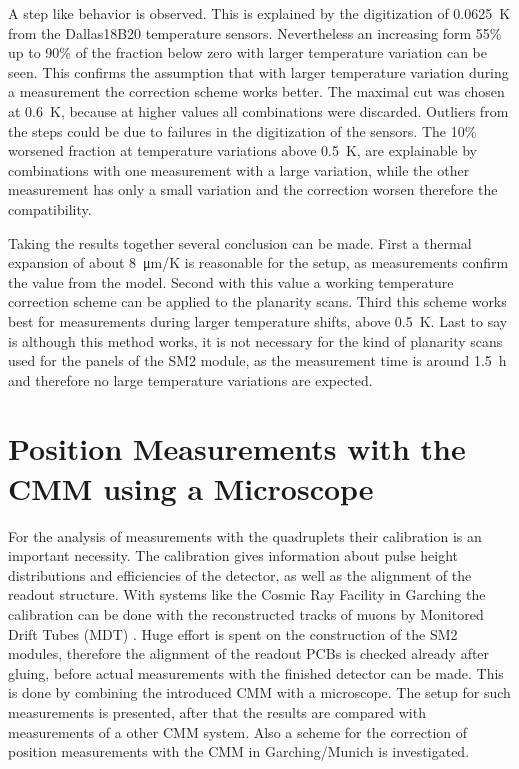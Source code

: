 \documentclass[
a4paper,                                %
twoside,                                %
BCOR1.4cm,                      %
10pt,                           %
headings=normal,                %
headsepline,                    %
clearplainpage, %
final,                                  %
div=14,
parskip=full,
openright,
bibliography=toc
]{scrreprt}
\begin{document}
A step like behavior is observed. This is explained by the digitization of \SI{0.0625}{\K} from the Dallas18B20 temperature sensors. Nevertheless an increasing form 55\% up to 90\% of the fraction below zero with larger temperature variation can be seen. This confirms the assumption that with larger temperature variation during a measurement the correction scheme works better. The maximal cut was chosen at \SI{0.6}{\K}, because at higher values all combinations were discarded. Outliers from the steps could be due to failures in the digitization of the sensors. The 10\% worsened fraction at temperature variations above \SI{0.5}{\K}, are explainable by combinations with one measurement with a large variation, while the other measurement has only a small variation and the correction worsen therefore the compatibility.

Taking the results together several conclusion can be made. First a thermal expansion of about \SI{8}{\micro\m/\K} is reasonable for the setup, as measurements confirm the value from the model. Second with this value a working temperature correction scheme can be applied to the planarity scans. Third this scheme works best for measurements during larger temperature shifts, above \SI{0.5}{\K}. Last to say is although this method works, it is not necessary for the kind of planarity scans used for the panels of the SM2 module, as the measurement time is around \SI{1.5}{\hour} and therefore no  large temperature variations are expected.

\chapter{Position Measurements with the CMM using a Microscope}

For the analysis of measurements with the quadruplets their calibration is an important necessity. The calibration gives information about pulse height distributions and efficiencies of the detector, as well as the alignment of the readout structure. With systems like the Cosmic Ray Facility in Garching the calibration can be done with the reconstructed tracks of muons by Monitored Drift Tubes (MDT) \cite{felixRthesis}. Huge effort is spent on the construction of the SM2 modules, therefore the alignment of the readout PCBs is checked already after gluing, before actual measurements with the finished detector can be made. This is done by combining the introduced CMM with a microscope. The setup for such measurements is presented, after that the results are compared with measurements of a other CMM system. Also a scheme for the correction of position measurements with the CMM in Garching/Munich is investigated.
\end{document}
